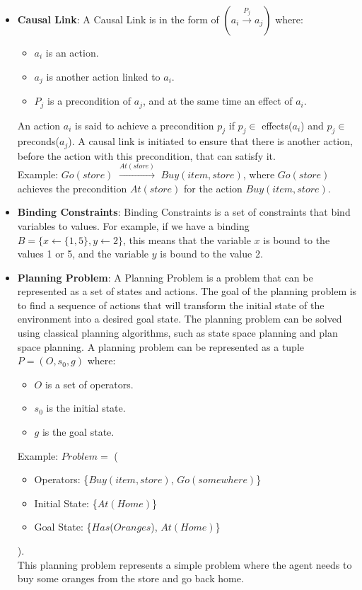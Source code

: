 \begin{itemize}
      \item \label{def:causal_link}
            \textbf{Causal Link}: A Causal Link is in the form of $(a_i \xrightarrow{\text{$P_j$}} a_j)$ where:
            \begin{itemize}
                  \item $a_i$ is an action.
                  \item $a_j$ is another action linked to $a_i$.
                  \item $P_j$ is a precondition of $a_j$, and at the same time an effect of $a_i$.
            \end{itemize}
            An action $a_i$ is said to achieve a precondition $p_j$ if $p_j \in$ effects($a_i$) and $p_j \in$ preconds($a_j$).
            A causal link is initiated to ensure that there is another action, before the action with this precondition, that can satisfy it.
            \\ Example: $Go(store)$ $\xrightarrow{\text{$At(store)$}}$ $Buy(item,store)$, where $Go(store)$ achieves the precondition $At(store)$ for the action $Buy(item,store)$.

      \item \label{def:binding_constraint}
            \textbf{Binding Constraints}: Binding Constraints is a set of constraints that bind variables to values.
            For example, if we have a binding $B = \{x \leftarrow \{1,5\}, y \leftarrow 2\}$, this means that the variable $x$ is bound to the values 1 or 5,
            and the variable $y$ is bound to the value 2.

      \item \label{def:planning_problem}
            \textbf{Planning Problem}: A Planning Problem is a problem that can be represented as a set of states and actions. The goal of the planning problem is to find a sequence of actions that will transform the initial state of the environment into a desired goal state. The planning problem can be solved using classical planning algorithms, such as state space planning and plan space planning. A planning problem can be represented as a tuple $P = (O, s_0, g)$ \cite{10.5555/975615} where:
            \begin{itemize}
                  \item $O$ is a set of operators.
                  \item $s_0$ is the initial state.
                  \item $g$ is the goal state.
            \end{itemize}
            Example: $Problem =$ (
            \begin{itemize}
                  \item Operators: \{$Buy(item,store)$, $Go(somewhere)$\}
                  \item Initial State: \{$At(Home)$\}
                  \item Goal State: \{$Has$($Oranges$), $At(Home)$\}
            \end{itemize}
            ).\\
            This planning problem represents a simple problem where the agent needs to buy some oranges from the store and go back home.


\end{itemize}
